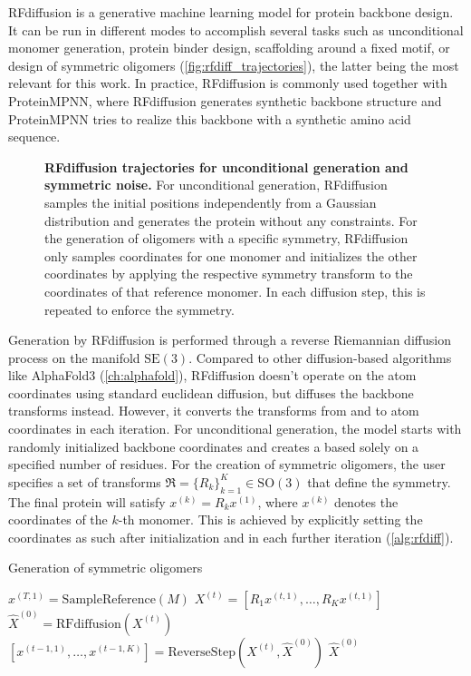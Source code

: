 RFdiffusion is a generative machine learning model for protein backbone design. It can be run in different modes to accomplish several tasks such as unconditional monomer generation, protein binder design, scaffolding around a fixed motif, or design of symmetric oligomers (\autoref{fig:rfdiff_trajectories}), the latter being the most relevant for this work. In practice, RFdiffusion is commonly used together with ProteinMPNN, where RFdiffusion generates synthetic backbone structure and ProteinMPNN tries to realize this backbone with a synthetic amino acid sequence. 

\begin{figure}
\centering

\caption{\textbf{RFdiffusion trajectories for unconditional generation and symmetric noise.} For unconditional generation, RFdiffusion samples the initial positions independently from a Gaussian distribution and generates the protein without any constraints. For the generation of oligomers with a specific symmetry, RFdiffusion only samples coordinates for one monomer and initializes the other coordinates by applying the respective symmetry transform to the coordinates of that reference monomer. In each diffusion step, this is repeated to enforce the symmetry. }
\label{fig:rfdiff_trajectories}
\end{figure}

Generation by RFdiffusion is performed through a reverse Riemannian diffusion process on the manifold $\mathrm{SE}(3)$. Compared to other diffusion-based algorithms like AlphaFold3 (\autoref{ch:alphafold}), RFdiffusion doesn't operate on the atom coordinates using standard euclidean diffusion, but diffuses the backbone transforms instead. However, it converts the transforms from and to atom coordinates in each iteration. For unconditional generation, the model starts with randomly initialized backbone coordinates and creates a based solely on a specified number of residues. For the creation of symmetric oligomers, the user specifies a set of transforms $\mathfrak{R}=\{R_k\}_{k=1}^K \in \mathrm{SO}(3)$ that define the symmetry. The final protein will satisfy $x^{(k)} = R_k x^{(1)}$, where $x^{(k)}$ denotes the coordinates of the $k$-th monomer. This is achieved by explicitly setting the coordinates as such after initialization and in each further iteration (\autoref{alg:rfdiff}). 

\begin{algorithm}
    \caption{Generation of symmetric oligomers}
    \begin{algorithmic}[1]
    \State $x^{(T,1)} = \text{SampleReference}(M)$
        \State $X^{(t)} = [R_1 x^{(t,1)}, \ldots, R_K x^{(t,1)}]$
        \State $\hat{X}^{(0)} = \text{RFdiffusion}(X^{(t)})$
        \State $[x^{(t-1,1)}, \ldots, x^{(t-1,K)}] = \text{ReverseStep}(X^{(t)}, \hat{X}^{(0)})$
    \EndFor
    \State \Return $\hat{X}^{(0)}$
    \end{algorithmic}
    \label{alg:rfdiff}
\end{algorithm}

